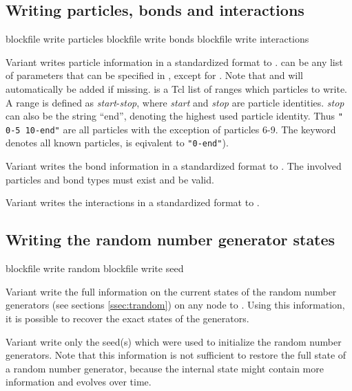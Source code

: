 \subsection{Writing particles, bonds and interactions}
\begin{essyntax}
   blockfile  write particles 
   
   blockfile  write bonds 
   blockfile  write interactions
\end{essyntax}

Variant  writes
particle information in a standardized format to .
 can be any list of parameters that can be specified in
, except for .  Note that
 and  will automatically be added if missing.
 is a Tcl list of ranges which particles to write. A range
is defined as \textit{start}-\textit{stop}, where \textit{start} and
\textit{stop} are particle identities. \textit{stop} can also be the
string ``end'', denoting the highest used particle identity. Thus
\texttt{"{} 0-5 10-end"{}} are all particles with the exception of
particles 6-9.  The keyword  denotes all known particles,
\ie{} is eqivalent to \texttt{"0-end"{}}).

Variant  writes the bond information in a standardized
format to . The involved particles and bond types must
exist and be valid.

Variant  writes the interactions in a standardized format
to .

\subsection{Writing the random number generator states}
\begin{essyntax}
   blockfile  write random
   blockfile  write seed
\end{essyntax}

Variant  write the full information on the
current states of the random number generators (see
sections \vref{ssec:trandom}) on any node to
.  Using this information, it is possible to recover the
exact states of the generators.

Variant  write only the seed(s) which were
used to initialize the random number generators. Note that this
information is not sufficient to restore the full state of a random
number generator, because the internal state might contain more
information and evolves over time.

